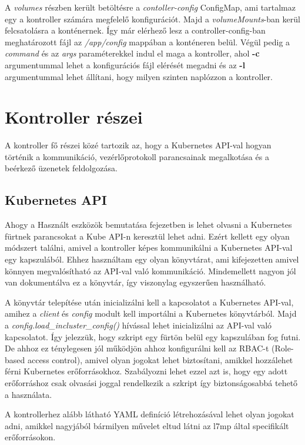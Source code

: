 A \textit{volumes} részben került betöltésre a \textit{contoller-config} ConfigMap, ami 
tartalmaz egy a kontroller számára megfelelő konfigurációt. Majd a \textit{volumeMounts}-ban
kerül felcsatolásra a konténernek. Így már elérhező lesz a controller-config-ban meghatározott
fájl az \textit{/app/config} mappában a konténeren belül. Végül pedig a \textit{command} és az
\textit{args} paraméterekkel indul el maga a kontroller, ahol \textbf{-c} argumentummal 
lehet a konfigurációs fájl elérését megadni és az \textbf{-l} argumentummal lehet állítani,
hogy milyen szinten naplózzon a kontroller.

\section{Kontroller részei}

A kontroller fő részei közé tartozik az, hogy a Kubernetes API-val 
hogyan történik a kommunikáció, vezérlőprotokoll parancsainak megalkotása és
a beérkező üzenetek feldolgozása. 

\subsection{Kubernetes API}

Ahogy a Használt eszközök bemutatása fejezetben is lehet olvasni a Kubernetes
fürtnek parancsokat a Kube API-n keresztül lehet adni. Ezért kellett egy olyan
módszert találni, amivel a kontroller képes kommunikálni a Kubernetes API-val 
egy kapszulából. Ehhez használtam egy olyan könyvtárat, ami kifejezetten amivel
könnyen megvalósítható az API-val való kommunikáció. Mindemellett nagyon jól
van dokumentálva ez a könyvtár, így viszonylag egyszerűen használható.

A könyvtár telepítése után inicializálni kell a kapcsolatot a Kubernetes 
API-val, amihez a \textit{client} és \textit{config} modult kell importálni
a Kubernetes könyvtárból. Majd a \textit{config.load\_incluster\_config()}
hívással lehet inicializálni az API-val való kapcsolatot. Így jelezzük, hogy 
szkript egy fürtön belül egy kapszulában fog futni. De ahhoz ez ténylegesen jól 
működjön ahhoz konfigurálni kell az RBAC-t (Role-based access control), amivel 
olyan jogokat lehet biztosítani, amikkel hozzálehet férni Kubernetes 
erőforrásokhoz. Szabályozni lehet ezzel azt is, hogy egy adott erőforráshoz 
csak olvasási joggal rendelkezik a szkript így biztonságosabbá tehető a használata.

A kontrollerhez alább látható YAML definíció létrehozásával lehet olyan jogokat
adni, amikkel nagyjából bármilyen művelet eltud látni az l7mp által specifikált 
erőforrásokon.

